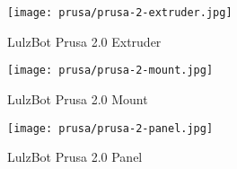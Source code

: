 \begin{figure}[h!]
\texttt{[image: prusa/prusa-2-extruder.jpg]}
 \caption{LulzBot Prusa 2.0 Extruder}
 \label{fig:prusa-2-extruder}
\end{figure}

\begin{figure}[h!]
\texttt{[image: prusa/prusa-2-mount.jpg]}
 \caption{LulzBot Prusa 2.0 Mount}
 \label{fig:prusa-2-mount}
\end{figure}

\begin{figure}[h!]
\texttt{[image: prusa/prusa-2-panel.jpg]}
 \caption{LulzBot Prusa 2.0 Panel}
 \label{fig:prusa-2-panel}
\end{figure}



